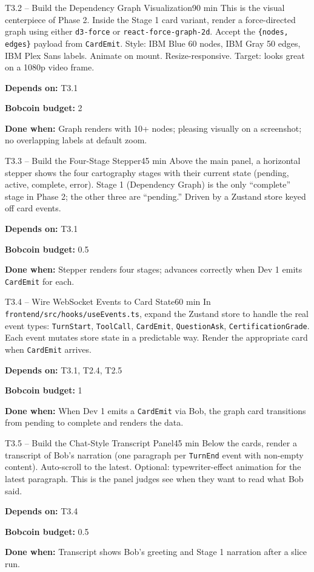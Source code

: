 \documentclass[11pt,letterpaper]{article}
\newcommand{\acceptance}[1]{\par\smallskip\textcolor{ibmgreen}{\textbf{Done when:}} #1}
\newcommand{\depends}[1]{\par\smallskip\textcolor{ibmorange}{\textbf{Depends on:}} #1}
\newcommand{\bobcost}[1]{\par\smallskip\textcolor{ibmaccent}{\textbf{Bobcoin budget:}} #1}
\begin{document}
\begin{task}{T3.2 -- Build the Dependency Graph Visualization}{90 min}
This is the visual centerpiece of Phase 2. Inside the Stage 1 card variant, render a force-directed graph using either \texttt{d3-force} or \texttt{react-force-graph-2d}. Accept the \texttt{\{nodes, edges\}} payload from \texttt{CardEmit}. Style: IBM Blue 60 nodes, IBM Gray 50 edges, IBM Plex Sans labels. Animate on mount. Resize-responsive. Target: looks great on a 1080p video frame.
\depends{T3.1}
\bobcost{2}
\acceptance{Graph renders with 10+ nodes; pleasing visually on a screenshot; no overlapping labels at default zoom.}
\end{task}

\begin{task}{T3.3 -- Build the Four-Stage Stepper}{45 min}
Above the main panel, a horizontal stepper shows the four cartography stages with their current state (pending, active, complete, error). Stage 1 (Dependency Graph) is the only ``complete'' stage in Phase 2; the other three are ``pending.'' Driven by a Zustand store keyed off card events.
\depends{T3.1}
\bobcost{0.5}
\acceptance{Stepper renders four stages; advances correctly when Dev 1 emits \texttt{CardEmit} for each.}
\end{task}

\begin{task}{T3.4 -- Wire WebSocket Events to Card State}{60 min}
In \texttt{frontend/src/hooks/useEvents.ts}, expand the Zustand store to handle the real event types: \texttt{TurnStart}, \texttt{ToolCall}, \texttt{CardEmit}, \texttt{QuestionAsk}, \texttt{CertificationGrade}. Each event mutates store state in a predictable way. Render the appropriate card when \texttt{CardEmit} arrives.
\depends{T3.1, T2.4, T2.5}
\bobcost{1}
\acceptance{When Dev 1 emits a \texttt{CardEmit} via Bob, the graph card transitions from pending to complete and renders the data.}
\end{task}

\begin{task}{T3.5 -- Build the Chat-Style Transcript Panel}{45 min}
Below the cards, render a transcript of Bob's narration (one paragraph per \texttt{TurnEnd} event with non-empty content). Auto-scroll to the latest. Optional: typewriter-effect animation for the latest paragraph. This is the panel judges see when they want to read what Bob said.
\depends{T3.4}
\bobcost{0.5}
\acceptance{Transcript shows Bob's greeting and Stage 1 narration after a slice run.}
\end{task}
\end{document}
